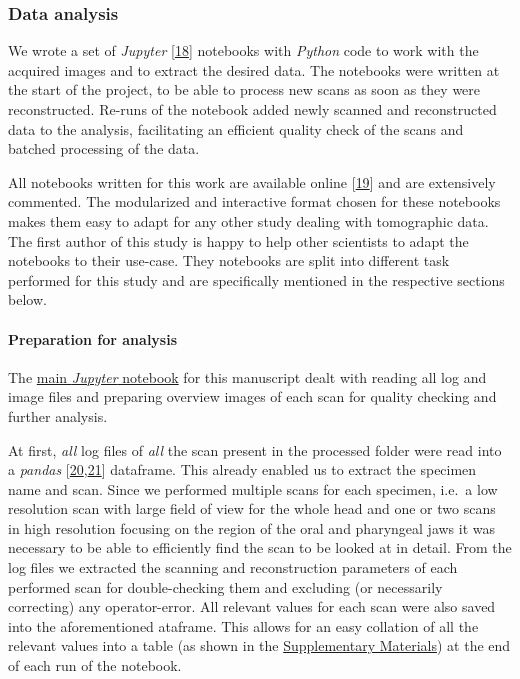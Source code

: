 \hypertarget{data-analysis}{%
\subsubsection{Data analysis}\label{data-analysis}}

We wrote a set of \emph{Jupyter} {[}\protect\hyperlink{ref-pQ6Wbz73}{18}{]} notebooks with \emph{Python} code to work with the acquired images and to extract the desired data.
The notebooks were written at the start of the project, to be able to process new scans as soon as they were reconstructed.
Re-runs of the notebook added newly scanned and reconstructed data to the analysis, facilitating an efficient quality check of the scans and batched processing of the data.

All notebooks written for this work are available online {[}\protect\hyperlink{ref-1HteOscVd}{19}{]} and are extensively commented.
The modularized and interactive format chosen for these notebooks makes them easy to adapt for any other study dealing with tomographic data.
The first author of this study is happy to help other scientists to adapt the notebooks to their use-case.
They notebooks are split into different task performed for this study and are specifically mentioned in the respective sections below.

\hypertarget{preparation-for-analysis}{%
\paragraph{Preparation for analysis}\label{preparation-for-analysis}}

The \href{https://github.com/habi/EAWAG/blob/master/DisplayFishes.ipynb}{main \emph{Jupyter} notebook} for this manuscript dealt with reading all log and image files and preparing overview images of each scan for quality checking and further analysis.

At first, \emph{all} log files of \emph{all} the scan present in the processed folder were read into a \emph{pandas} {[}\protect\hyperlink{ref-19qQOHlFN}{20},\protect\hyperlink{ref-U5AcoDOX}{21}{]} dataframe.
This already enabled us to extract the specimen name and scan.
Since we performed multiple scans for each specimen, i.e.~a low resolution scan with large field of view for the whole head and one or two scans in high resolution focusing on the region of the oral and pharyngeal jaws it was necessary to be able to efficiently find the scan to be looked at in detail.
From the log files we extracted the scanning and reconstruction parameters of each performed scan for double-checking them and excluding (or necessarily correcting) any operator-error.
All relevant values for each scan were also saved into the aforementioned ataframe.
This allows for an easy collation of all the relevant values into a table (as shown in the \protect\hyperlink{supplementary-materials}{Supplementary Materials}) at the end of each run of the notebook.

